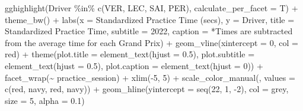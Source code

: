 \documentclass[
]{book}
\newenvironment{Shaded}{\begin{snugshade}}{\end{snugshade}}
\newcommand{\AttributeTok}[1]{\textcolor[rgb]{0.77,0.63,0.00}{#1}}
\newcommand{\DecValTok}[1]{\textcolor[rgb]{0.00,0.00,0.81}{#1}}
\newcommand{\FloatTok}[1]{\textcolor[rgb]{0.00,0.00,0.81}{#1}}
\newcommand{\FunctionTok}[1]{\textcolor[rgb]{0.00,0.00,0.00}{#1}}
\newcommand{\NormalTok}[1]{#1}
\newcommand{\SpecialCharTok}[1]{\textcolor[rgb]{0.00,0.00,0.00}{#1}}
\newcommand{\StringTok}[1]{\textcolor[rgb]{0.31,0.60,0.02}{#1}}
\begin{document}
\begin{Shaded}
\begin{Highlighting}[]
  \FunctionTok{gghighlight}\NormalTok{(Driver }\SpecialCharTok{\%in\%} \FunctionTok{c}\NormalTok{(}\StringTok{\textquotesingle{}VER\textquotesingle{}}\NormalTok{, }\StringTok{\textquotesingle{}LEC\textquotesingle{}}\NormalTok{, }\StringTok{\textquotesingle{}SAI\textquotesingle{}}\NormalTok{, }\StringTok{\textquotesingle{}PER\textquotesingle{}}\NormalTok{), }\AttributeTok{calculate\_per\_facet =}\NormalTok{ T) }\SpecialCharTok{+}
   \FunctionTok{theme\_bw}\NormalTok{() }\SpecialCharTok{+}
   \FunctionTok{labs}\NormalTok{(}\AttributeTok{x =} \StringTok{\textquotesingle{}Standardized Practice Time (secs)\textquotesingle{}}\NormalTok{,}
        \AttributeTok{y =} \StringTok{\textquotesingle{}Driver\textquotesingle{}}\NormalTok{,}
        \AttributeTok{title =} \StringTok{\textquotesingle{}Standardized Practice Time\textquotesingle{}}\NormalTok{,}
        \AttributeTok{subtitle =} \StringTok{\textquotesingle{}2022\textquotesingle{}}\NormalTok{,}
        \AttributeTok{caption =} \StringTok{\textquotesingle{}*Times are subtracted from the average time for each Grand Prix\textquotesingle{}}\NormalTok{) }\SpecialCharTok{+}
   \FunctionTok{geom\_vline}\NormalTok{(}\AttributeTok{xintercept =} \DecValTok{0}\NormalTok{, }\AttributeTok{col =} \StringTok{\textquotesingle{}red\textquotesingle{}}\NormalTok{) }\SpecialCharTok{+}
   \FunctionTok{theme}\NormalTok{(}\AttributeTok{plot.title =} \FunctionTok{element\_text}\NormalTok{(}\AttributeTok{hjust =} \FloatTok{0.5}\NormalTok{),}
         \AttributeTok{plot.subtitle =} \FunctionTok{element\_text}\NormalTok{(}\AttributeTok{hjust =} \FloatTok{0.5}\NormalTok{),}
         \AttributeTok{plot.caption =} \FunctionTok{element\_text}\NormalTok{(}\AttributeTok{hjust =} \DecValTok{0}\NormalTok{)) }\SpecialCharTok{+}
  \FunctionTok{facet\_wrap}\NormalTok{(}\SpecialCharTok{\textasciitilde{}}\NormalTok{ practice\_session) }\SpecialCharTok{+}
  \FunctionTok{xlim}\NormalTok{(}\SpecialCharTok{{-}}\DecValTok{5}\NormalTok{, }\DecValTok{5}\NormalTok{) }\SpecialCharTok{+}
  \FunctionTok{scale\_color\_manual}\NormalTok{(}\StringTok{\textquotesingle{}\textquotesingle{}}\NormalTok{, }\AttributeTok{values =} \FunctionTok{c}\NormalTok{(}\StringTok{\textquotesingle{}red\textquotesingle{}}\NormalTok{, }\StringTok{\textquotesingle{}navy\textquotesingle{}}\NormalTok{, }\StringTok{\textquotesingle{}red\textquotesingle{}}\NormalTok{, }\StringTok{\textquotesingle{}navy\textquotesingle{}}\NormalTok{))  }\SpecialCharTok{+}
  \FunctionTok{geom\_hline}\NormalTok{(}\AttributeTok{yintercept =} \FunctionTok{seq}\NormalTok{(}\DecValTok{22}\NormalTok{, }\DecValTok{1}\NormalTok{, }\SpecialCharTok{{-}}\DecValTok{2}\NormalTok{), }\AttributeTok{col =} \StringTok{\textquotesingle{}grey\textquotesingle{}}\NormalTok{, }\AttributeTok{size =} \DecValTok{5}\NormalTok{, }\AttributeTok{alpha =}  \FloatTok{0.1}\NormalTok{)}
\end{Highlighting}
\end{Shaded}
\end{document}
